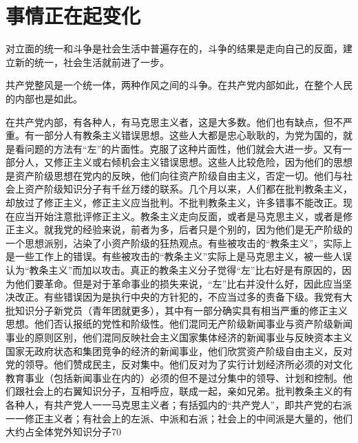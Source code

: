 \section[事情正在起变化（一九五七年五月）]{事情正在起变化}


对立面的统一和斗争是社会生活中普遍存在的，斗争的结果是走向自己的反面，建立新的统一，社会生活就前进了一步。

共产党整风是一个统一体，两种作风之间的斗争。在共产党内部如此，在整个人民的内部也是如此。

在共产党内部，有各种人，有马克思主义者，这是大多数。他们也有缺点，但不严重。有一部分人有教条主义错误思想。这些人大都是忠心耿耿的，为党为国的，就是看问题的方法有“左”的片面性。克服了这种片面性，他们就会大进一步。又有一部分人，又修正主义或右倾机会主义错误思想。这些人比较危险，因为他们的思想是资产阶级思想在党内的反映，他们向往资产阶级自由主义，否定一切。他们与社会上资产阶级知识分子有千丝万缕的联系。几个月以来，人们都在批判教条主义，却放过了修正主义，修正主义应当批判。不批判教条主义，许多错事不能改正。现在应当开始注意批评修正主义。教条主义走向反面，或者是马克思主义，或者是修正主义。就我党的经验来说，前者为多，后者只是个别的，因为他们是无产阶级的一个思想派别，沾染了小资产阶级的狂热观点。有些被攻击的“教条主义”，实际上是一些工作上的错误。有些被攻击的“教条主义”实际上是马克思主义，被一些人误认为“教条主义”而加以攻击。真正的教条主义分子觉得“左”比右好是有原因的，因为他们要革命。但是对于革命事业的损失来说，“左”比右并没什么好，因此应当坚决改正。有些错误因为是执行中央的方针犯的，不应当过多的责备下级。我党有大批知识分子新党员（青年团就更多），其中有一部分确实具有相当严重的修正主义思想。他们否认报纸的党性和阶级性。他们混同无产阶级新闻事业与资产阶级新闻事业的原则区别，他们混同反映社会主义国家集体经济的新闻事业与反映资本主义国家无政府状态和集团竞争的经济的新闻事业，他们欣赏资产阶级自由主义，反对党的领导。他们赞成民主，反对集中。他们反对为了实行计划经济所必须的对文化教育事业（包括新闻事业在内的）必须的但不是过分集中的领导、计划和控制。他们跟社会上的右翼知识分子，互相呼应，联成一起，亲如兄弟。批判教条主义的有各种人，有共产党人一一马克思主义者；有括弧内的“共产党人”，即共产党的右派一一修正主义者；有社会上的左派、中派和右派；社会上的中间派是大量的，他们大约占全体党外知识分子70%

